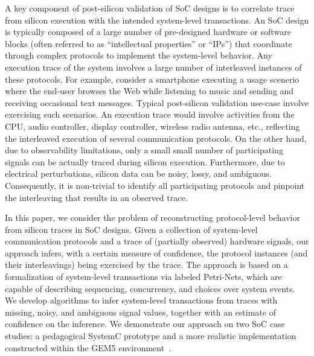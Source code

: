 \documentclass[conference]{IEEEtran}
\begin{document}
A key component of post-silicon validation of SoC designs is
to correlate trace from silicon execution with the intended
system-level transactions.  An SoC design is typically
composed of a large number of pre-designed hardware or
software blocks (often referred to as ``intellectual
properties'' or ``IPs'') that coordinate through complex
protocols to implement the system-level behavior.  Any
execution trace of the system involves a large number of
interleaved instances of these protocols.  For example,
consider a smartphone executing a usage scenerio where the
end-user browses the Web while listening to music and
sending and receiving occasional text messages.  Typical
post-silicon validation use-case involve exercising such
scenarios.  An execution trace would involve activities from
the CPU, audio controller, display controller, wireless
radio antenna, etc., reflecting the interleaved execution of
several communication protocols.  On the other hand, due to
observability limitations, only a small small number of
participating signals can be actually traced during silicon
execution.  Furthermore, due to electrical perturbations,
silicon data can be noisy, lossy, and ambiguous.
Consequently, it is non-trivial to identify all
participating protocols and pinpoint the interleaving that
results in an observed trace.

In this paper, we consider the problem of reconstructing
protocol-level behavior from silicon traces in SoC designs.
Given a collection of system-level communication protocols
and a trace of (partially observed) hardware signals, our
approach infers, with a certain measure of confidence, the
protocol instances (and their interleavings) being exercised
by the trace.  The approach is based on a formalization of
system-level transactions via labeled Petri-Nets, which are
capable of describing sequencing, concurrency, and choices
over system events.  We develop algorithms to infer
system-level transactions from traces with missing, noisy,
and ambiguous signal values, together with an estimate of
confidence on the inference.  We demonstrate our approach on
two SoC case studies: a pedagogical SystemC prototype and a
more realistic implementation constructed within the GEM5
environment~\cite{Binkert2011}.
\end{document}
